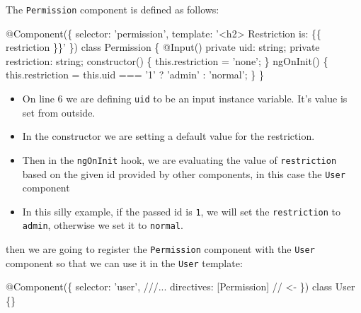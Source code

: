 \documentclass[12pt,]{article}
\newenvironment{Shaded}{}{}
\newcommand{\KeywordTok}[1]{\textcolor[rgb]{0.00,0.00,1.00}{{#1}}}
\newcommand{\DecValTok}[1]{{#1}}
\newcommand{\CommentTok}[1]{\textcolor[rgb]{0.00,0.50,0.00}{{#1}}}
\newcommand{\FunctionTok}[1]{{#1}}
\newcommand{\NormalTok}[1]{{#1}}
\providecommand{\tightlist}{%
  \setlength{\itemsep}{0pt}\setlength{\parskip}{0pt}}
\begin{document}
The \texttt{Permission} component is defined as follows:

\begin{Shaded}
\begin{Highlighting}[numbers=left,,]
\FunctionTok{@Component}\NormalTok{(\{}
  \NormalTok{selector: 'permission',}
  \NormalTok{template: '<h2> Restriction is: \{\{ restriction \}\}'}
\NormalTok{\})}
\KeywordTok{class} \NormalTok{Permission \{}
  \FunctionTok{@Input}\NormalTok{() }\KeywordTok{private} \NormalTok{uid: string;}
  \KeywordTok{private} \NormalTok{restriction: string;}
  \FunctionTok{constructor}\NormalTok{() \{}
    \KeywordTok{this}\NormalTok{.}\FunctionTok{restriction} \NormalTok{= 'none';}
  \NormalTok{\}}
  \FunctionTok{ngOnInit}\NormalTok{() \{}
    \KeywordTok{this}\NormalTok{.}\FunctionTok{restriction} \NormalTok{= }\KeywordTok{this}\NormalTok{.}\FunctionTok{uid} \NormalTok{=== '}\DecValTok{1}\NormalTok{' ? 'admin' : 'normal';}
  \NormalTok{\}}
\NormalTok{\}}
\end{Highlighting}
\end{Shaded}

\begin{itemize}
\tightlist
\item
  On line 6 we are defining \texttt{uid} to be an input instance
  variable. It's value is set from outside.
\item
  In the constructor we are setting a default value for the restriction.
\item
  Then in the \texttt{ngOnInit} hook, we are evaluating the value of
  \texttt{restriction} based on the given id provided by other
  components, in this case the \texttt{User} component
\item
  In this silly example, if the passed id is \texttt{1}, we will set the
  \texttt{restriction} to \texttt{admin}, otherwise we set it to
  \texttt{normal}.
\end{itemize}

then we are going to register the \texttt{Permission} component with the
\texttt{User} component so that we can use it in the \texttt{User}
template:

\begin{Shaded}
\begin{Highlighting}[numbers=left,,]
\FunctionTok{@Component}\NormalTok{(\{}
  \NormalTok{selector: 'user',}
  \CommentTok{///...}
  \NormalTok{directives: [Permission] }\CommentTok{// <-}
\NormalTok{\})}
\KeywordTok{class} \NormalTok{User \{\}}
\end{Highlighting}
\end{Shaded}
\end{document}
